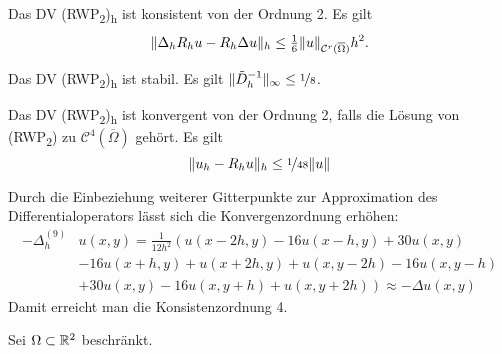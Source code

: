 \documentclass{cheat-sheet}
\newcommand{\Cont}{\mathcal{C}} %
\newcommand{\clos}[1]{\overline{#1}} %
\newcommand{\cOmega}{\clos{\Omega}} %
\newcommand{\Laplace}{\Delta}
\newcommand{\tss}[1]{\textsubscript{#1}} %
\begin{document}

\begin{lem}
  Das DV (RWP\tss{2})\tss{h} ist konsistent von der Ordnung 2.
  Es gilt
  \[ \norm{\Laplace_h R_h u - R_h \Laplace u}_h \leq \tfrac{1}{6} \norm{u}_{\Cont^r(\cOmega)} h^2. \]
\end{lem}

\begin{lem}
  Das DV (RWP\tss{2})\tss{h} ist stabil.
  Es gilt $\lVert\tilde{D}_h^{-1}\rVert_\infty \leq \nicefrac{1}{8}$.
\end{lem}


\begin{satz}
  Das DV (RWP\tss{2})\tss{h} ist konvergent von der Ordnung 2, falls die Lösung von (RWP\tss{2}) zu $\Cont^4(\cOmega)$ gehört.
  Es gilt
  \[ \lVert u_h - R_h u\rVert_h \leq \nicefrac{1}{48} \lVert u\rVert \]
\end{satz}

\begin{bem}
  Durch die Einbeziehung weiterer Gitterpunkte zur Approximation des Differentialoperators lässt sich die Konvergenzordnung erhöhen:
  \begin{align*}
    - \Laplace_h^{(9)} & u(x, y) = \tfrac{1}{12 h^2} \left( u(x{-}2h, y) - 16 u(x{-}h, y) + 30 u(x, y) \right. \\
    & \left. - 16 u(x{+}h, y) + u(x{+}2h, y) + u(x, y{-}2h) - 16 u(x, y{-}h) \right. \\
    & \left. + 30 u(x, y) - 16 u(x, y{+}h) + u(x, y{+}2h) \right) \approx - \Laplace u(x, y)
  \end{align*}
  Damit erreicht man die Konsistenzordnung 4.
\end{bem}


\begin{situation}
  Sei $\Omega \subset \mathbb{R}^2$ beschränkt.
\end{situation}
\end{document}
